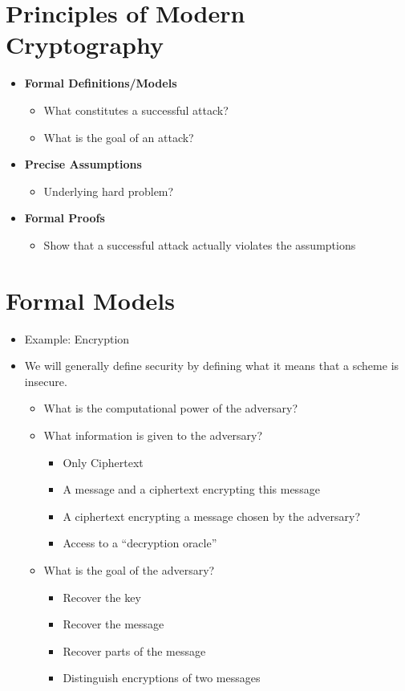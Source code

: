 	\section{Principles of Modern Cryptography}
		\begin{itemize}
			\item \textbf{Formal Definitions/Models}
				\begin{itemize}
					\item What constitutes a successful attack?
					\item What is the goal of an attack?
				\end{itemize}
			\item \textbf{Precise Assumptions}
				\begin{itemize}
					\item Underlying hard problem?
				\end{itemize}
			\item \textbf{Formal Proofs}
				\begin{itemize}
					\item Show that a successful attack actually violates the assumptions
				\end{itemize}
		\end{itemize}
	
	\section{Formal Models}
		\begin{itemize}
			\item Example: Encryption
			\item We will generally define security by defining what it means that a scheme is insecure.
			\begin{itemize}
				\item What is the computational power of the adversary?
				\item What information is given to the adversary?
				\begin{itemize}
					\item Only Ciphertext
					\item A message and a ciphertext encrypting this message
					\item A ciphertext encrypting a message chosen by the adversary?
					\item Access to a “decryption oracle”
				\end{itemize}
				\item What is the goal of the adversary?
				\begin{itemize}
					\item Recover the key
					\item Recover the message
					\item Recover parts of the message
					\item Distinguish encryptions of two messages
				\end{itemize}
			\end{itemize}
		\end{itemize}
	
